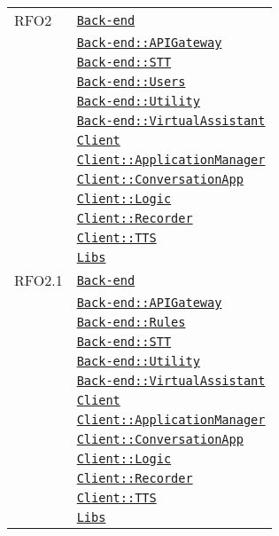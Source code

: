 \begin{longtable}{|>{\centering}m{3cm}|m{10cm}<{\centering}|}
RFO2 & \hyperref[Back-end]{\texttt{Back-end}}\\
& \hyperref[Back-end::APIGateway]{\texttt{Back-end::APIGateway}}\\
& \hyperref[Back-end::STT]{\texttt{Back-end::STT}}\\
& \hyperref[Back-end::Users]{\texttt{Back-end::Users}}\\
& \hyperref[Back-end::Utility]{\texttt{Back-end::Utility}}\\
& \hyperref[Back-end::VirtualAssistant]{\texttt{Back-end::VirtualAssistant}}\\
& \hyperref[Client]{\texttt{Client}}\\
& \hyperref[Client::ApplicationManager]{\texttt{Client::ApplicationManager}}\\
& \hyperref[Client::ConversationApp]{\texttt{Client::ConversationApp}}\\
& \hyperref[Client::Logic]{\texttt{Client::Logic}}\\
& \hyperref[Client::Recorder]{\texttt{Client::Recorder}}\\
& \hyperref[Client::TTS]{\texttt{Client::TTS}}\\
& \hyperref[Libs]{\texttt{Libs}}\\ \hline

RFO2.1 & \hyperref[Back-end]{\texttt{Back-end}}\\
& \hyperref[Back-end::APIGateway]{\texttt{Back-end::APIGateway}}\\
& \hyperref[Back-end::Rules]{\texttt{Back-end::Rules}}\\
& \hyperref[Back-end::STT]{\texttt{Back-end::STT}}\\
& \hyperref[Back-end::Utility]{\texttt{Back-end::Utility}}\\
& \hyperref[Back-end::VirtualAssistant]{\texttt{Back-end::VirtualAssistant}}\\
& \hyperref[Client]{\texttt{Client}}\\
& \hyperref[Client::ApplicationManager]{\texttt{Client::ApplicationManager}}\\
& \hyperref[Client::ConversationApp]{\texttt{Client::ConversationApp}}\\
& \hyperref[Client::Logic]{\texttt{Client::Logic}}\\
& \hyperref[Client::Recorder]{\texttt{Client::Recorder}}\\
& \hyperref[Client::TTS]{\texttt{Client::TTS}}\\
& \hyperref[Libs]{\texttt{Libs}}\\ \hline


\end{longtable}
